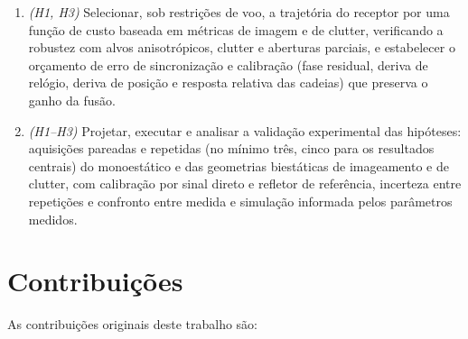 \documentclass[12pt,a4paper,oneside]{book}
\theoremstyle{remark}
\theoremstyle{plain}
\theoremstyle{definition}
\begin{document}
\begin{enumerate}[label=\textbf{O\arabic*.},leftmargin=*]
  \item \emph{(H1, H3)} Selecionar, sob restrições de voo, a trajetória do
  receptor por uma função de custo baseada em métricas de imagem e de clutter,
  verificando a robustez com alvos anisotrópicos, clutter e aberturas parciais,
  e estabelecer o orçamento de erro de sincronização e calibração (fase
  residual, deriva de relógio, deriva de posição e resposta relativa das cadeias)
  que preserva o ganho da fusão.
  \item \emph{(H1--H3)} Projetar, executar e analisar a validação experimental
  das hipóteses: aquisições pareadas e repetidas (no mínimo três, cinco para os
  resultados centrais) do monoestático e das geometrias biestáticas de
  imageamento e de clutter, com calibração por sinal direto e refletor de
  referência, incerteza entre repetições e confronto entre medida e simulação
  informada pelos parâmetros medidos.
\end{enumerate}

\section{Contribuições}
\label{sec:intro_contrib}

As contribuições originais deste trabalho são:
\end{document}

